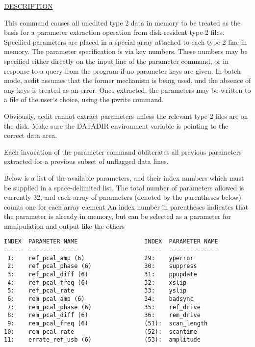 \underline{DESCRIPTION}
\begin{list}{}{\setlength{\leftmargin}{0.5in}
     \setlength{\rightmargin}{0in}}
\item
This command causes all unedited type 2 data in memory to be treated as the
basis for a parameter extraction operation from disk-resident type-2 files.
Specified parameters are placed in a special array attached to each type-2 line
in memory.  The parameter specification is via key numbers.  These numbers
may be specified either directly on the input line of the parameter command,
or in response to a query from the program if no parameter keys are given.
In batch mode, aedit assumes that the former mechanism is being used, and
the absence of any keys is treated as an error.  Once extracted, the parameters
may be written to a file of the user`s choice, using the pwrite command.
\item
Obviously, aedit cannot extract parameters unless the relevant type-2 files are
on the disk.  Make sure the DATADIR environment variable is pointing to the 
correct data area.
\item
Each invocation of the parameter command obliterates all previous parameters
extracted for a previous subset of unflagged data lines.
\item
Below is a list of the available parameters, and their index numbers which
must be supplied in a space-delimited list.  The total number of parameters 
allowed is currently 32, and each array of parameters (denoted by the parentheses 
below) counts one for each array element An index number in parentheses indicates 
that the parameter is already in memory, but can be selected as a parameter 
for manipulation and output like the others
\item
\begin{verbatim}
INDEX  PARAMETER NAME                   INDEX  PARAMETER NAME
-----  --------------                   -----  --------------
 1:    ref_pcal_amp (6)                 29:    yperror
 2:    ref_pcal_phase (6)               30:    suppress
 3:    ref_pcal_diff (6)                31:    ppupdate
 4:    ref_pcal_freq (6)                32:    xslip
 5:    ref_pcal_rate                    33:    yslip
 6:    rem_pcal_amp (6)                 34:    badsync
 7:    rem_pcal_phase (6)               35:    ref_drive
 8:    rem_pcal_diff (6)                36:    rem_drive
 9:    rem_pcal_freq (6)                (51):  scan_length
10:    rem_pcal_rate                    (52):  scantime
11:    errate_ref_usb (6)               (53):  amplitude

\end{verbatim}
\end{list}
